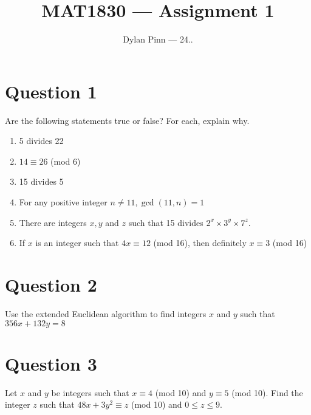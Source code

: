 \documentclass[11pt]{article}
\begin{document}
\title{MAT1830 --- Assignment 1}
\author{Dylan Pinn --- 24..} %
\maketitle

\section*{Question 1}
Are the following statements true or false? For each, explain why.
\begin{enumerate}[label= (\alph*)]
\item 5 divides 22
\item $14 \equiv 26$ (mod 6)
\item 15 divides 5
\item For any positive integer $n \neq 11, \gcd(11, n) = 1$
\item There are integers $x, y$ and $z$ such that 15 divides $2^x \times 3^y
  \times 7^z$.
\item If $x$ is an integer such that $4x \equiv 12$ (mod 16), then definitely $x
  \equiv 3$ (mod 16)
\end{enumerate}

\section*{Question 2}
Use the extended Euclidean algorithm to find integers $x$ and $y$ such that
$356x + 132y = 8$

\section*{Question 3}
Let $x$ and $y$ be integers such that $x \equiv 4$ (mod 10) and $y \equiv 5$
(mod 10).  Find the integer $z$ such that $48x + 3y^2 \equiv z$ (mod 10) and $0
\leq z \leq 9$.
\end{document}
